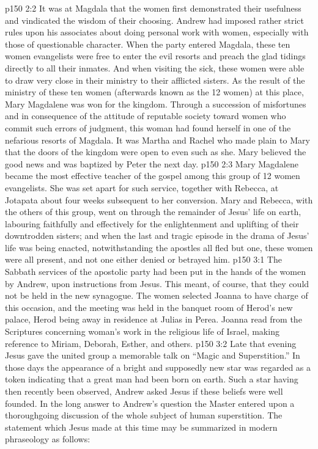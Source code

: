 \vs p150 2:2 It was at Magdala that the women first demonstrated their usefulness and vindicated the wisdom of their choosing. Andrew had imposed rather strict rules upon his associates about doing personal work with women, especially with those of questionable character. When the party entered Magdala, these ten women evangelists were free to enter the evil resorts and preach the glad tidings directly to all their inmates. And when visiting the sick, these women were able to draw very close in their ministry to their afflicted sisters. As the result of the ministry of these ten women (afterwards known as the 12 women) at this place, Mary Magdalene was won for the kingdom. Through a succession of misfortunes and in consequence of the attitude of reputable society toward women who commit such errors of judgment, this woman had found herself in one of the nefarious resorts of Magdala. It was Martha and Rachel who made plain to Mary that the doors of the kingdom were open to even such as she. Mary believed the good news and was baptized by Peter the next day.
\vs p150 2:3 Mary Magdalene became the most effective teacher of the gospel among this group of 12 women evangelists. She was set apart for such service, together with Rebecca, at Jotapata about four weeks subsequent to her conversion. Mary and Rebecca, with the others of this group, went on through the remainder of Jesus’ life on earth, labouring faithfully and effectively for the enlightenment and uplifting of their downtrodden sisters; and when the last and tragic episode in the drama of Jesus’ life was being enacted, notwithstanding the apostles all fled but one, these women were all present, and not one either denied or betrayed him.
\vs p150 3:1 The Sabbath services of the apostolic party had been put in the hands of the women by Andrew, upon instructions from Jesus. This meant, of course, that they could not be held in the new synagogue. The women selected Joanna to have charge of this occasion, and the meeting was held in the banquet room of Herod’s new palace, Herod being away in residence at Julias in Perea. Joanna read from the Scriptures concerning woman’s work in the religious life of Israel, making reference to Miriam, Deborah, Esther, and others.
\vs p150 3:2 \pc Late that evening Jesus gave the united group a memorable talk on “Magic and Superstition.” In those days the appearance of a bright and supposedly new star was regarded as a token indicating that a great man had been born on earth. Such a star having then recently been observed, Andrew asked Jesus if these beliefs were well founded. In the long answer to Andrew’s question the Master entered upon a thoroughgoing discussion of the whole subject of human superstition. The statement which Jesus made at this time may be summarized in modern phraseology as follows:

